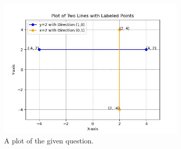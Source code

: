 \documentclass[journal]{IEEEtran}
\begin{document}
	 \\
	 \\
	
\begin{figure}[h]
	\centering
	\includegraphics[width=0.8\textwidth]{figs/figure.jpg}
	\caption{A plot of the given question.}
\end{figure}
\end{document}
